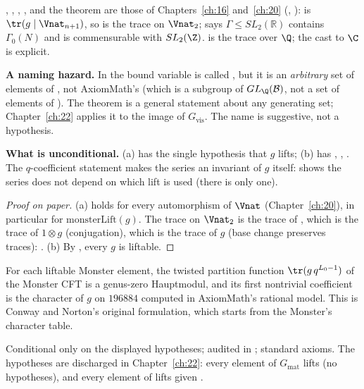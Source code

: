 \begin{dictionary}
, , , ,
 and the theorem  are those of
Chapters~\ref{ch:16} and~\ref{ch:20} (, ):
 is $\tr(g\mid\Vnat_{n+1})$, so  is the trace on
$\Vnat_2$;  says $\Gamma\le SL_2(\mathbb{R})$ contains $\Gamma_0(N)$ and is commensurable
with $SL_2(\Z)$.   is the trace over $\Q$; the cast to $\C$ is explicit.

\textbf{A naming hazard.}  In  the bound variable is called
, but it is an \emph{arbitrary} set of elements of , not AxiomMath's
 (which is a subgroup of $GL_\Q(\chXXIB)$, not a set of elements of ).  The
theorem is a general statement about any generating set; Chapter~\ref{ch:22} applies it to the image of
$G_{\mathrm{vis}}$.  The name is suggestive, not a hypothesis.

\textbf{What is unconditional.}  (a) has the single hypothesis that $g$ lifts; (b) has ,
, .  The $q$-coefficient statement makes the series an invariant of $g$ itself:
 shows the series does not depend on which lift is used (there is
only one).
\end{dictionary}
\begin{proof}[Proof on paper]
(a)  holds for every automorphism of $\Vnat$ (Chapter~\ref{ch:20}), in particular for
$\mathrm{monsterLift}(g)$.  The trace on $\Vnat_2$ is the trace of , which is the trace of
$1\otimes g$ (conjugation), which is the trace of $g$ (base change preserves traces):
.  (b) By , every $g$ is liftable.
\end{proof}
\begin{physics}
For each liftable Monster element, the twisted partition function $\tr(g\,q^{L_0-1})$ of the Monster CFT
is a genus-zero Hauptmodul, and its first nontrivial coefficient is the character of $g$ on $196884$
computed in AxiomMath's rational model.  This is Conway and Norton's original formulation, which starts
from the Monster's character table.
\end{physics}
\begin{status}
Conditional only on the displayed hypotheses; audited in ;
standard axioms.  The hypotheses are discharged in Chapter~\ref{ch:22}: every element of $G_{\mathrm{mat}}$
lifts (no hypotheses), and every element of  lifts given .
\end{status}

